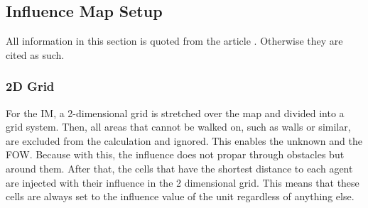 \documentclass[]{report}
\begin{document}
	\subsection{Influence Map Setup}
	All information in this section is quoted from the article \citep{gameDevInfluenceMap}. Otherwise they are cited as such. \newline
	
	\subsubsection{2D Grid} \label{2dgrid}
	For the \ac{IM}, a 2-dimensional grid is stretched over the map and divided into a grid system. Then, all areas that cannot be walked on, such as walls or similar, are excluded from the calculation and ignored. This enables the unknown and the \ac{FOW}. Because with this, the influence does not propar through obstacles but around them. After that, the cells that have the shortest distance to each agent are injected with their influence in the 2 dimensional grid. This means that these cells are always set to the influence value of the unit regardless of anything else. 
	
\end{document}
